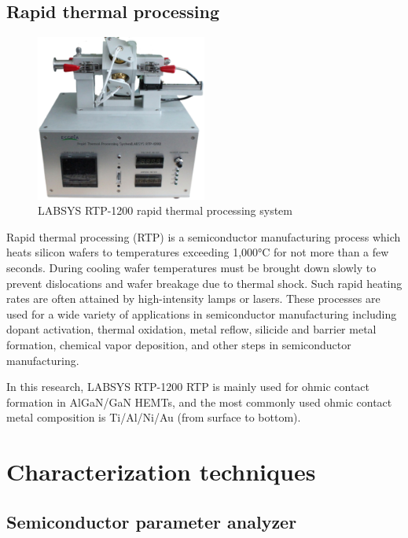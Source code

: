 \subsection{Rapid thermal processing}

\begin{figure}[H] 
\centering    
\includegraphics[width=0.5\textwidth]{RTP}
\caption[LABSYS RTP-1200 rapid thermal processing system]{LABSYS RTP-1200 rapid thermal processing system}
\label{fig:RTP}
\end{figure}

Rapid thermal processing (RTP)  is a semiconductor manufacturing process which heats silicon wafers to temperatures exceeding 1,000°C for not more than a few seconds. During cooling wafer temperatures must be brought down slowly to prevent dislocations and wafer breakage due to thermal shock. Such rapid heating rates are often attained by high-intensity lamps or lasers. These processes are used for a wide variety of applications in semiconductor manufacturing including dopant activation, thermal oxidation, metal reflow, silicide and barrier metal formation, chemical vapor deposition, and other steps in semiconductor manufacturing.

In this research, LABSYS RTP-1200 RTP is mainly used for ohmic contact formation in AlGaN/GaN HEMTs, and the most commonly used ohmic contact metal composition is Ti/Al/Ni/Au (from surface to bottom).


\section{Characterization techniques}

\subsection{Semiconductor parameter analyzer}

